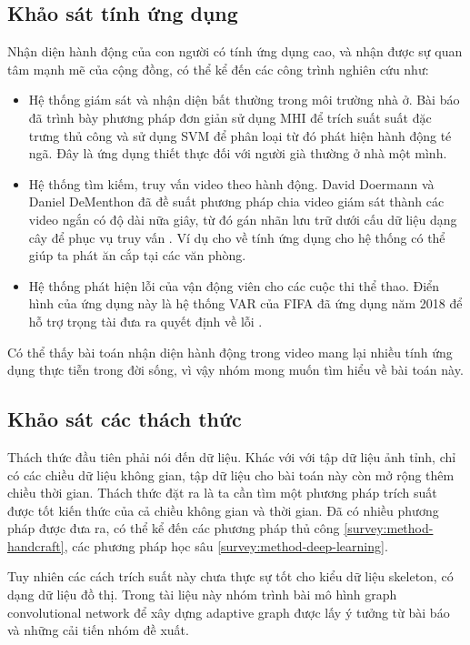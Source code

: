\subsection{Khảo sát tính ứng dụng}

Nhận diện hành động của con người có tính ứng dụng cao, và nhận được sự quan tâm mạnh mẽ của cộng đồng, có thể kể đến các công trình nghiên cứu như:

\begin{itemize}
    \item Hệ thống giám sát và nhận diện bất thường trong môi trường nhà ở. Bài báo \cite{gunale2019intelligent} đã trình bày phương pháp đơn giản sử dụng MHI để trích suất suất đặc trưng thủ công và sử dụng SVM để phân loại từ đó phát hiện hành động té ngã. Đây là ứng dụng thiết thực đối với người già thường ở nhà một mình.
    \item Hệ thống tìm kiếm, truy vấn video theo hành động. David Doermann và Daniel DeMenthon đã đề suất phương pháp chia video giám sát thành các video ngắn có độ dài nữa giây, từ đó gán nhãn lưu trữ dưới cấu dữ liệu dạng cây để phục vụ truy vấn \cite{lin2012human}. Ví dụ cho về tính ứng dụng cho hệ thống có thể giúp ta phát ăn cắp tại các văn phòng.
    \item Hệ thống phát hiện lỗi của vận động viên cho các cuộc thi thể thao. Điển hình của ứng dụng này là hệ thống VAR của FIFA đã ứng dụng năm 2018 để  hỗ trợ trọng tài đưa ra quyết định về lỗi \cite{petersen2019var}.
\end{itemize}

Có thể thấy bài toán nhận diện hành động trong video mang lại nhiều tính ứng dụng thực tiễn trong đời sống, vì vậy nhóm mong muốn tìm hiểu về bài toán này.

\subsection{Khảo sát các thách thức}

Thách thức đầu tiên phải nói đến dữ liệu. Khác với với tập dữ liệu ảnh tỉnh, chỉ có các chiều dữ liệu không gian, tập dữ liệu cho bài toán này còn mở rộng thêm chiều thời gian. Thách thức đặt ra là ta cần tìm một phương pháp trích suất được tốt kiến thức của cả chiều không gian và thời gian. Đã có nhiều phương pháp được đưa ra, có thể  kể đến các phương pháp thủ công \ref{survey:method-handcraft}, các phương pháp học sâu \ref{survey:method-deep-learning}.

Tuy nhiên các cách trích suất này chưa thực sự tốt cho kiểu dữ liệu skeleton, có dạng dữ liệu đồ thị. Trong tài liệu này nhóm trình bài mô hình graph convolutional network để xây dựng adaptive graph được lấy ý tưởng từ bài báo \cite{shi2020skeleton} và những cải tiến nhóm đề xuất.

